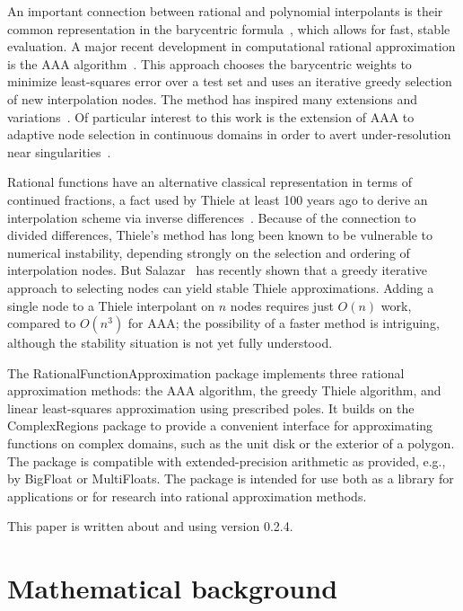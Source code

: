 \documentclass{juliacon}
\begin{document}
An important connection between rational and polynomial interpolants is their common representation in the barycentric formula~\cite{berrutBarycentricLagrange2004,schneiderNewAspects1986}, which allows for fast, stable evaluation. A major recent development in computational rational approximation is the AAA algorithm~\cite{nakatsukasaAAAAlgorithm2018}. This approach chooses the barycentric weights to minimize least-squares error over a test set and uses an iterative greedy selection of new interpolation nodes. The method has inspired many extensions and variations~\cite{filipRationalMinimax2018,hochmanFastAAAFast2017,nakatsukasaAlgorithmReal2020,wilberDatadrivenAlgorithms2022}. Of particular interest to this work is the extension of AAA to adaptive node selection in continuous domains in order to avert under-resolution near singularities~\cite{driscollAAARational2024}.

Rational functions have an alternative classical representation in terms of continued fractions, a fact used by Thiele at least 100 years ago to derive an interpolation scheme via inverse differences~\cite{milne-thompsonCalculusFinite1933}. Because of the connection to divided differences, Thiele's method has long been known to be vulnerable to numerical instability, depending strongly on the selection and ordering of interpolation nodes. But Salazar~\cite{celisAdaptiveThiele2023,celisNumericalContinued2024} has recently shown that a greedy iterative approach to selecting nodes can yield stable Thiele approximations. Adding a single node to a Thiele interpolant on $n$ nodes requires just $O(n)$ work, compared to $O(n^3)$ for AAA; the possibility of a faster method is intriguing, although the stability situation is not yet fully understood.

The \textsf{RationalFunctionApproximation} package implements three rational approximation methods: the AAA algorithm, the greedy Thiele algorithm, and linear least-squares approximation using prescribed poles. It builds on the \textsf{ComplexRegions} package to provide a convenient interface for approximating functions on complex domains, such as the unit disk or the exterior of a polygon. The package is compatible with extended-precision arithmetic as provided, e.g., by \textsf{BigFloat} or \textsf{MultiFloats}. The package is intended for use both as a library for applications or for research into rational approximation methods.

This paper is written about and using version 0.2.4. 

\section{Mathematical background}
\label{sec:math}
\end{document}
